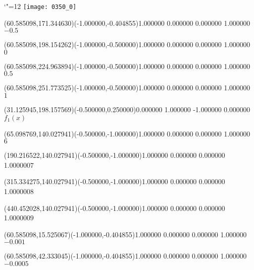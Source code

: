 \documentclass[12pt]{article}
\begin{document}
\makeatletter%
\let\ASYencoding\f@encoding%
\let\ASYfamily\f@family%
\let\ASYseries\f@series%
\let\ASYshape\f@shape%
\makeatother%
{\catcode`"=12%
\texttt{[image: 0350\_0]}%
}%
\kern -447.828093pt%
%
%
\fontsize{12.000000}{14.400000}\selectfont%
\usefont{\ASYencoding}{\ASYfamily}{\ASYseries}{\ASYshape}%
\ASYalignT(60.585098,171.344630)(-1.000000,-0.404855){1.000000 0.000000 0.000000 1.000000}{\vphantom{$10^4$}$-0.5$}%
%
%
\fontsize{12.000000}{14.400000}\selectfont%
\ASYalignT(60.585098,198.154262)(-1.000000,-0.500000){1.000000 0.000000 0.000000 1.000000}{\vphantom{$10^4$}$0$}%
%
%
\fontsize{12.000000}{14.400000}\selectfont%
\ASYalignT(60.585098,224.963894)(-1.000000,-0.500000){1.000000 0.000000 0.000000 1.000000}{\vphantom{$10^4$}$0.5$}%
%
%
\fontsize{12.000000}{14.400000}\selectfont%
\ASYalignT(60.585098,251.773525)(-1.000000,-0.500000){1.000000 0.000000 0.000000 1.000000}{\vphantom{$10^4$}$1$}%
%
%
\fontsize{12.000000}{14.400000}\selectfont%
\ASYalignT(31.125945,198.157569)(-0.500000,0.250000){0.000000 1.000000 -1.000000 0.000000}{$f_1(x)$}%
%
%
\fontsize{12.000000}{14.400000}\selectfont%
\ASYalignT(65.098769,140.027941)(-0.500000,-1.000000){1.000000 0.000000 0.000000 1.000000}{\vphantom{$10^4$}$6$}%
%
%
\fontsize{12.000000}{14.400000}\selectfont%
\ASYalignT(190.216522,140.027941)(-0.500000,-1.000000){1.000000 0.000000 0.000000 1.000000}{\vphantom{$10^4$}$7$}%
%
%
\fontsize{12.000000}{14.400000}\selectfont%
\ASYalignT(315.334275,140.027941)(-0.500000,-1.000000){1.000000 0.000000 0.000000 1.000000}{\vphantom{$10^4$}$8$}%
%
%
\fontsize{12.000000}{14.400000}\selectfont%
\ASYalignT(440.452028,140.027941)(-0.500000,-1.000000){1.000000 0.000000 0.000000 1.000000}{\vphantom{$10^4$}$9$}%
%
%
\fontsize{12.000000}{14.400000}\selectfont%
\ASYalignT(60.585098,15.525067)(-1.000000,-0.404855){1.000000 0.000000 0.000000 1.000000}{\vphantom{$10^4$}$-0.001$}%
%
%
\fontsize{12.000000}{14.400000}\selectfont%
\ASYalignT(60.585098,42.333045)(-1.000000,-0.404855){1.000000 0.000000 0.000000 1.000000}{\vphantom{$10^4$}$-0.0005$}%
%
%
\end{document}
